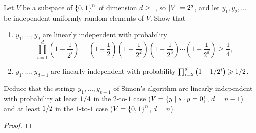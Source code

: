 \begin{exercisebox}
\begin{exercise}\label{ex:indep-1001}\label{thm:indep-1001}
    Let $V$ be a subspace of $\left\lbrace0,1\right\rbrace^n$ of dimension $d \geq 1$, so $\left\lvert V\right\rvert = 2^d$, and let
    $y_1, y_2, \dots$ be independent uniformly random elements of $V$. Show that
    \begin{enumerate}
        \item $y_1, \dots, y_d$ are linearly independent with probability
              \[\prod_{i=1}^{d} \left(1 - \frac{1}{2^i}\right)
                  = \left(1 - \frac{1}{2}\right)\left(1 - \frac{1}{2^2}\right)\left(1 - \frac{1}{2^3}\right) \cdots \left(1 - \frac{1}{2^d}\right)
                  \geq \frac{1}{4},\]
        \item $y_1, \dots, y_{d-1}$ are linearly independent with probability
              $\prod_{i=2}^{d} \left(1 - 1/2^i\right) \geqslant 1/2$.
    \end{enumerate}
    Deduce that the strings $y_1, \dots, y_{n-1}$ of Simon's algorithm are linearly independent with
    probability at least $1/4$ in the $2$-to-$1$ case
    ($V = \left\lbrace y \mid s \cdot y = 0\right\rbrace$, $d = n - 1$) and at least $1/2$ in the
    $1$-to-$1$ case ($V = \left\lbrace0,1\right\rbrace^n$, $d = n$).
\end{exercise}
\tcblower
\begin{proof}

\end{proof}
\end{exercisebox}
